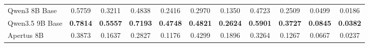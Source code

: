 \documentclass{article}
\begin{document}
\begin{table}[t]
\begin{adjustbox}{width=\textwidth}
\begin{tabular}{l|cc|cc|cc|cc|cc}
Qwen3 8B Base
& 0.5759 & 0.3211
& 0.4838 & 0.2416
& 0.2970 & 0.1350
& 0.4723 & 0.2509
& 0.0499 & 0.0186 \\

Qwen3.5 9B Base
& \textbf{0.7814} & \textbf{0.5557}
& \textbf{0.7193} & \textbf{0.4748}
& \textbf{0.4821} & \textbf{0.2624}
& \textbf{0.5901} & \textbf{0.3727}
& \textbf{0.0845} & \textbf{0.0382} \\

Apertus 8B
& 0.3873 & 0.1637
& 0.2827 & 0.1176
& 0.4299 & 0.1896
& 0.3264 & 0.1267
& 0.0667 & 0.0237 \\

\bottomrule

\end{tabular}

\end{adjustbox}

\end{table}
\end{document}

